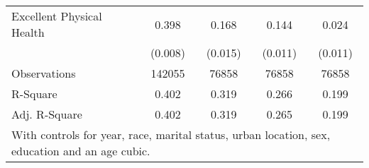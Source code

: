 \begin{table}
\begin{tabular}{l*{4}{c}}
Excellent Physical Health&       0.398\sym{***}&       0.168\sym{***}&       0.144\sym{***}&       0.024\sym{*}  \\
                    &     (0.008)         &     (0.015)         &     (0.011)         &     (0.011)         \\
\midrule
Observations        &      142055         &       76858         &       76858         &       76858         \\
R-Square            &       0.402         &       0.319         &       0.266         &       0.199         \\
Adj. R-Square       &       0.402         &       0.319         &       0.265         &       0.199         \\
\bottomrule
\multicolumn{5}{l}{\scriptsize{With controls for year, race, marital status, urban location, sex, education and an age cubic.}} \\
\end{tabular}
\end{table}

